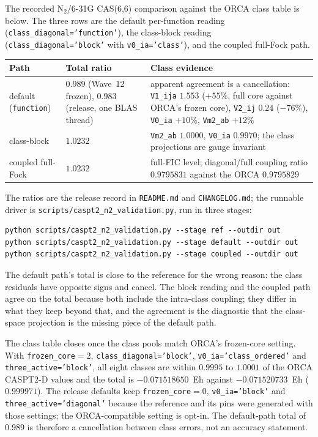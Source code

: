 The recorded N$_2$/6-31G CAS(6,6) comparison against the ORCA class
table is below.  The three rows are the default per-function reading
(\texttt{class\_diagonal='function'}), the class-block reading
(\texttt{class\_diagonal='block'} with \texttt{v0\_ia='class'}), and
the coupled full-Fock path.
\begin{center}
\small
\begin{tabularx}{\textwidth}{>{\raggedright\arraybackslash}p{}>{\raggedright\arraybackslash}p{}X}
\toprule
Path & Total ratio & Class evidence \\
\midrule
default (\texttt{function}) &
  $0.989$ (Wave~12 frozen), $0.983$ (release, one BLAS thread) &
  apparent agreement is a cancellation: \texttt{V1\_ija} $1.553$
  ($+55\%$, full core against ORCA's frozen core), \texttt{V2\_ij}
  $0.24$ ($-76\%$), \texttt{V0\_ia} $+10\%$, \texttt{Vm2\_ab} $+12\%$ \\
class-block &
  $1.0232$ &
  \texttt{Vm2\_ab} $1.0000$, \texttt{V0\_ia} $0.9970$; the class
  projections are gauge invariant \\
coupled full-Fock &
  $1.0232$ &
  full-FIC level; diagonal/full coupling ratio $0.9795831$ against the
  ORCA $0.9795829$ \\
\bottomrule
\end{tabularx}
\end{center}
The ratios are the release record in \texttt{README.md} and
\texttt{CHANGELOG.md}; the runnable driver is
\texttt{scripts/caspt2\_n2\_validation.py}, run in three stages:
\begin{lstlisting}
python scripts/caspt2_n2_validation.py --stage ref --outdir out
python scripts/caspt2_n2_validation.py --stage default --outdir out
python scripts/caspt2_n2_validation.py --stage coupled --outdir out
\end{lstlisting}
The default path's total is close to the reference for the wrong
reason: the class residuals have opposite signs and cancel.  The block
reading and the coupled path agree on the total because both include
the intra-class coupling; they differ in what they keep beyond that,
and the agreement is the diagnostic that the class-space projection is
the missing piece of the default path.

{\sloppy
The class table closes once the class pools match ORCA's frozen-core
setting.  With \texttt{frozen\_core}$=2$,
\texttt{class\_diagonal='block'}, \texttt{v0\_ia='class\_ordered'} and
\texttt{three\_active='block'}, all eight classes are within $0.9995$ to
$1.0001$ of the ORCA CASPT2-D values and the total is $-0.071518650$~Eh
against $-0.071520733$~Eh ($0.999971$).  The release defaults keep
\texttt{frozen\_core}$=0$, \texttt{v0\_ia='block'} and
\texttt{three\_active='diagonal'} because the reference and its pins
were generated with those settings; the ORCA-compatible setting is
opt-in.  The default-path total of $0.989$ is therefore a cancellation
between class errors, not an accuracy statement.\par}

